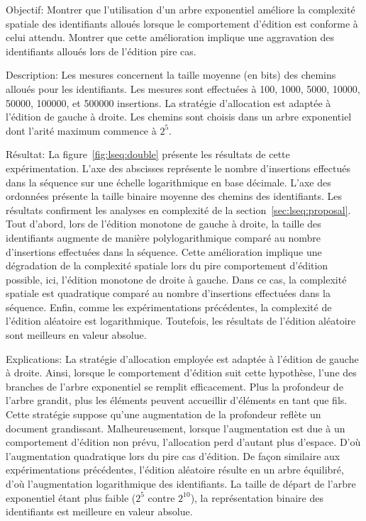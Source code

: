 \begin{asparadesc}
\item [Objectif:] Montrer que l'utilisation d'un arbre exponentiel améliore la
  complexité spatiale des identifiants alloués lorsque le comportement d'édition
  est conforme à celui attendu. Montrer que cette amélioration implique une
  aggravation des identifiants alloués lors de l'édition pire cas.
\item [Description:] Les mesures concernent la taille moyenne (en bits) des
  chemins alloués pour les identifiants. Les mesures sont effectuées à 100,
  1000, 5000, 10000, 50000, 100000, et 500000 insertions. La stratégie
  d'allocation est adaptée à l'édition de gauche à droite. Les chemins sont
  choisis dans un arbre exponentiel dont l'arité maximum commence à $2^{5}$.
\item [Résultat:] La figure~\ref{fig:lseq:double} présente les résultats de
  cette expérimentation. L'axe des abscisses représente le nombre d'insertions
  effectués dans la séquence sur une échelle logarithmique en base
  décimale. L'axe des ordonnées présente la taille binaire moyenne des chemins
  des identifiants. Les résultats confirment les analyses en complexité de la
  section~\ref{sec:lseq:proposal}. Tout d'abord, lors de l'édition monotone de
  gauche à droite, la taille des identifiants augmente de manière
  polylogarithmique comparé au nombre d'insertions effectuées dans la séquence.
  Cette amélioration implique une dégradation de la complexité spatiale lors du
  pire comportement d'édition possible, ici, l'édition monotone de droite à
  gauche. Dans ce cas, la complexité spatiale est quadratique comparé au nombre
  d'insertions effectuées dans la séquence. Enfin, comme les expérimentations
  précédentes, la complexité de l'édition aléatoire est
  logarithmique. Toutefois, les résultats de l'édition aléatoire sont meilleurs
  en valeur absolue.
\item [Explications:] La stratégie d'allocation employée est adaptée à l'édition
  de gauche à droite. Ainsi, lorsque le comportement d'édition suit cette
  hypothèse, l'une des branches de l'arbre exponentiel se remplit efficacement.
  Plus la profondeur de l'arbre grandit, plus les éléments peuvent accueillir
  d'éléments en tant que fils. Cette stratégie suppose qu'une augmentation de la
  profondeur reflète un document grandissant. Malheureusement, lorsque
  l'augmentation est due à un comportement d'édition non prévu, l'allocation
  perd d'autant plus d'espace. D'où l'augmentation quadratique lors du pire cas
  d'édition. De façon similaire aux expérimentations précédentes, l'édition
  aléatoire résulte en un arbre équilibré, d'où l'augmentation logarithmique des
  identifiants. La taille de départ de l'arbre exponentiel étant plus faible
  ($2^{5}$ contre $2^{10}$), la représentation binaire des identifiants est
  meilleure en valeur absolue.
\end{asparadesc}

